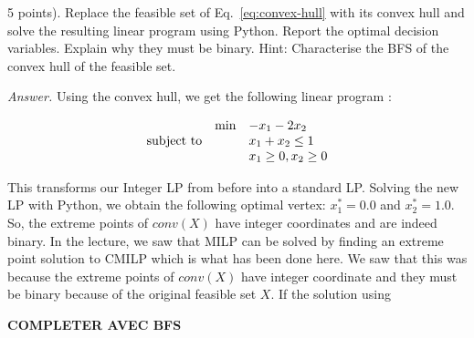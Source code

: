 \documentclass[10pt]{article}
\newenvironment{exercise}[2][Exercise]{\begin{trivlist}
  \item[\hskip \labelsep {\bfseries #1}\hskip \labelsep {\bfseries #2.}]}{\end{trivlist}}
\begin{document}
\begin{exercise}{4}
(5 points). Replace the feasible set of Eq.~\ref{eq:convex-hull} with its convex hull and solve the resulting linear program using Python. Report the optimal decision variables. Explain why they must be binary. Hint:
Characterise the BFS of the convex hull of the feasible set.


\textit{Answer.}
Using the convex hull, we get the following linear program : 

\begin{equation*}
\begin{array}{lll@{}lll}
&\text{min}  & - x_1 - 2 x_2  &\\
\text{subject to} 
&& x_1 + x_2 \leq 1 \\
&&  x_1  \geq 0,  x_2 \geq 0 \\
          
\end{array}
\end{equation*}

This transforms our Integer LP from before into a standard LP. Solving the new LP with Python, we obtain  the following optimal vertex: $x_1^*=  0.0$ and $x_2^* = 1.0$. So, the extreme points of $conv(X)$ have integer coordinates and are indeed binary. In the lecture, we saw that MILP can be solved by finding an extreme point solution to CMILP which is what has been done here. We saw that this was because the extreme points of $conv(X)$ have integer coordinate and they must be binary because of the original feasible set $X$. If the solution using  

\textbf{COMPLETER AVEC BFS}

\end{exercise}
  
  
\end{document}
